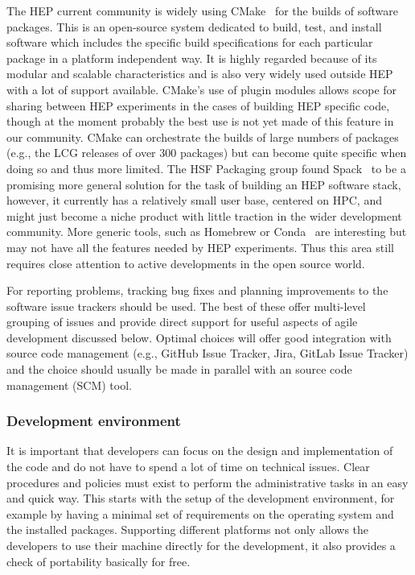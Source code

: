 \documentclass[12pt,a4paper]{article}
\begin{document}
The HEP current community is widely using CMake~\cite{CMake} for the builds of
software packages. This is an open-source system dedicated to build,
test, and install software which includes the specific build
specifications for each particular package in a platform independent
way. It is highly regarded because of its modular and scalable
characteristics and is also very widely used outside HEP with a lot of
support available. CMake's use of plugin modules allows scope for
sharing between HEP experiments in the cases of building HEP specific
code, though at the moment probably the best use is not yet made of this
feature in our community. CMake can orchestrate the builds of large
numbers of packages (e.g., the LCG releases of over 300 packages) but
can become quite specific when doing so and thus more limited. The HSF
Packaging group found
Spack~\cite{HSF-TN-2016-03,Gamblin:2015:SPM:2807591.2807623}
to be a promising
more general solution for the task of building an HEP software stack, however, it
currently has a relatively small user base, centered on HPC, and might
just become a niche product with little traction in the wider
development community. More generic tools, such as Homebrew\cite{Homebrew} or
Conda~\cite{Conda} are interesting but may not have all the features needed by
HEP experiments.
Thus this area still requires close attention to active developments in
the open source world.

For reporting problems, tracking bug fixes and planning improvements to
the software issue trackers should be used. The best of these offer
multi-level grouping of issues and provide direct support for useful
aspects of agile development discussed below. Optimal choices will offer
good integration with source code management (e.g., GitHub Issue
Tracker, Jira, GitLab Issue Tracker) and the choice should usually be
made in parallel with an source code management (SCM) tool.

\hypertarget{development-environment}{%
\subsubsection{Development environment}\label{development-environment}}

It is important that developers can focus on the design and
implementation of the code and do not have to spend a lot of time on
technical issues. Clear procedures and policies must exist to perform
the administrative tasks in an easy and quick way. This starts with the
setup of the development environment, for example by having a minimal
set of requirements on the operating system and the installed packages.
Supporting different platforms not only allows the developers to use
their machine directly for the development, it also provides a check of
portability basically for free.
\end{document}
